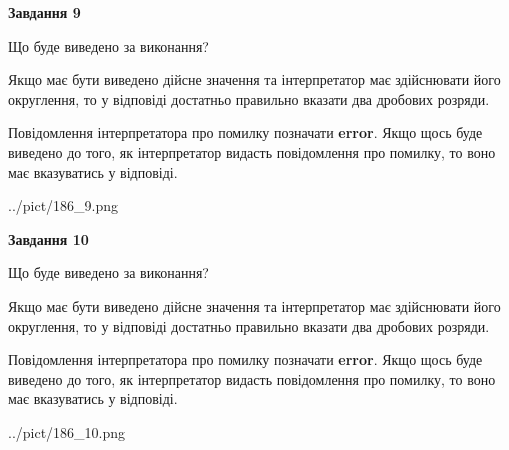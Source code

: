 \documentclass[12pt, ukrainian]{article}
\begin{document}
{\begin {Large}
{\begin {center}\textbf{Завдання 9}\end {center}}\par
Що буде виведено за виконання? \par

Якщо має бути виведено дійсне значення та інтерпретатор має здійснювати його округлення, 
то у відповіді достатньо правильно вказати два дробових розряди.

Повідомлення інтерпретатора про помилку позначати \textbf{error}.
Якщо щось буде виведено до того, як інтерпретатор видасть повідомлення про помилку, 
то воно має вказуватись у відповіді. \par

\begin{center}
	{../pict/186_9.png}
\end{center}
\newpage

{\begin {center}\textbf{Завдання 10}\end {center}}\par
Що буде виведено за виконання? \par

Якщо має бути виведено дійсне значення та інтерпретатор має здійснювати його округлення, 
то у відповіді достатньо правильно вказати два дробових розряди.

Повідомлення інтерпретатора про помилку позначати \textbf{error}.
Якщо щось буде виведено до того, як інтерпретатор видасть повідомлення про помилку, 
то воно має вказуватись у відповіді. \par

\begin{center}
	{../pict/186_10.png}
\end{center}
\newpage

\end {Large}}
\end{document}
